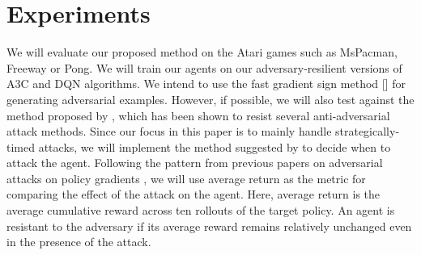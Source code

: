 \section{Experiments}
We will evaluate our proposed method on the Atari games such as MsPacman, Freeway or Pong. We will train our agents on our adversary-resilient versions of A3C and DQN algorithms. We intend to use the fast gradient sign method [\cite{seventeen}] for generating adversarial examples. However, if possible, we will also test against the method proposed by \cite{eighteen}, which has been shown to resist several anti-adversarial attack methods. Since our focus in this paper is to mainly handle strategically-timed attacks, we will implement the method suggested by \cite{fourteen} to decide when to attack the agent. Following the pattern from previous papers on adversarial attacks on policy gradients \cite{thirteen, fourteen}, we will use average return as the metric for comparing the effect of the attack on the agent. Here, average return is the average cumulative reward across ten rollouts of the target policy. An agent is resistant to the adversary if its average reward remains relatively unchanged even in the presence of the attack. 

